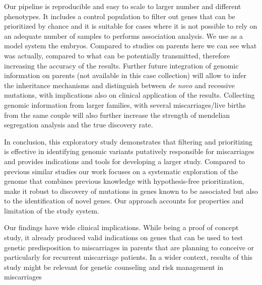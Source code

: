 Our pipeline is reproducible and easy to scale to larger number and different phenotypes. It includes a control population to filter out genes that can be prioritized by chance and it is suitable for cases where it is not possible to rely on an adequate number of samples to performs association analysis. We use as a model system the embryos. Compared to studies on parents here we can see what was actually, compared to what can be potentially transmitted, therefore increasing the accuracy of the results. Further future integration of genomic information on parents (not available in this case collection) will allow to infer the inheritance mechanisms and distinguish between \textit{de novo} and recessive mutations, with implications also on clinical application of the results. Collecting genomic information from larger families, with several miscarriages/live births from the same couple will also further increase the strength of mendelian segregation analysis and the true discovery rate.  %


  
In conclusion, this exploratory study demonstrates that filtering and prioritizing is effective in identifying genomic variants putatively responsible for miscarriages and provides indications and tools for developing a larger study.  Compared to previous similar studies our work focuses on a systematic exploration of the genome that combines previous knowledge with hypothesis-free prioritization, make it robust to discovery of mutations in genes known to be associated but also to the identification of novel genes. Our approach accounts for properties and limitation of the study system.


Our findings have wide clinical implications. While being a proof of concept study, it already produced valid indications on genes that can be used to test genetic predisposition to miscarriages in parents that are planning to conceive or particularly for recurrent miscarriage patients. In a wider context, results of this study might be relevant for genetic counseling and risk management in miscarriages


